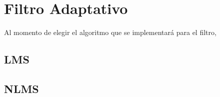 \documentclass[main.tex]{subfiles}
\begin{document}
\section{Filtro Adaptativo}
Al momento de elegir el algoritmo que se implementará para el filtro, 
\subsection{LMS}
\subsection{NLMS}
\end{document}
